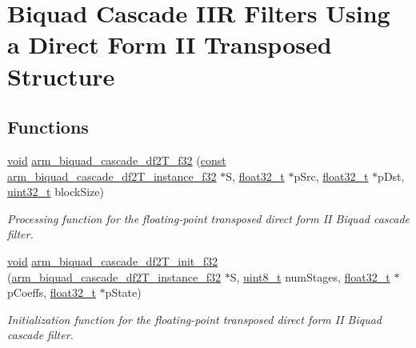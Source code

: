 \hypertarget{group___biquad_cascade_d_f2_t}{\section{Biquad Cascade I\-I\-R Filters Using a Direct Form I\-I Transposed Structure}
\label{group___biquad_cascade_d_f2_t}
}
\subsection*{Functions}
\begin{DoxyCompactItemize}
\item 
\hyperlink{group___n_a_m_e_ga18028b8badbf1ea7e704ccac3c488e82}{void} \hyperlink{group___biquad_cascade_d_f2_t_ga646c25998bf35991c60299b1431460f7}{arm\-\_\-biquad\-\_\-cascade\-\_\-df2\-T\-\_\-f32} (\hyperlink{group___n_a_m_e_ga7ae6d0e43244213b34de2c2b9aa30da6}{const} \hyperlink{structarm__biquad__cascade__df2_t__instance__f32}{arm\-\_\-biquad\-\_\-cascade\-\_\-df2\-T\-\_\-instance\-\_\-f32} $\ast$S, \hyperlink{arm__math_8h_a4611b605e45ab401f02cab15c5e38715}{float32\-\_\-t} $\ast$p\-Src, \hyperlink{arm__math_8h_a4611b605e45ab401f02cab15c5e38715}{float32\-\_\-t} $\ast$p\-Dst, \hyperlink{stdint_8h_a435d1572bf3f880d55459d9805097f62}{uint32\-\_\-t} block\-Size)
\begin{DoxyCompactList}\small\item\em Processing function for the floating-\/point transposed direct form I\-I Biquad cascade filter. \end{DoxyCompactList}\item 
\hyperlink{group___n_a_m_e_ga18028b8badbf1ea7e704ccac3c488e82}{void} \hyperlink{group___biquad_cascade_d_f2_t_ga70eaddf317a4a8bde6bd6a97df67fedd}{arm\-\_\-biquad\-\_\-cascade\-\_\-df2\-T\-\_\-init\-\_\-f32} (\hyperlink{structarm__biquad__cascade__df2_t__instance__f32}{arm\-\_\-biquad\-\_\-cascade\-\_\-df2\-T\-\_\-instance\-\_\-f32} $\ast$S, \hyperlink{stdint_8h_aba7bc1797add20fe3efdf37ced1182c5}{uint8\-\_\-t} num\-Stages, \hyperlink{arm__math_8h_a4611b605e45ab401f02cab15c5e38715}{float32\-\_\-t} $\ast$p\-Coeffs, \hyperlink{arm__math_8h_a4611b605e45ab401f02cab15c5e38715}{float32\-\_\-t} $\ast$p\-State)
\begin{DoxyCompactList}\small\item\em Initialization function for the floating-\/point transposed direct form I\-I Biquad cascade filter. \end{DoxyCompactList}\end{DoxyCompactItemize}


